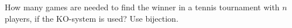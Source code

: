 How many games are needed to find the winner in a tennis tournament with $n$ players, if the KO-system is used? Use bijection.
